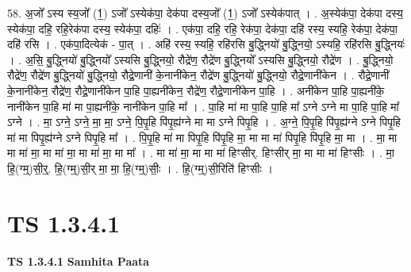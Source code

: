 \documentclass[17pt]{extarticle}
\begin{document}
58. अ॒जो᳚ ऽस्य स्य॒जो᳚ (1॒) ऽजो᳚ ऽस्येक॑पा॒ देक॑पा दस्य॒जो᳚ (1॒) ऽजो᳚ ऽस्येक॑पात् । . अ॒स्येक॑पा॒ देक॑पा दस्य॒ स्येक॑पा॒ दहि॒ रहि॒रेक॑पा दस्य॒ स्येक॑पा॒ दहिः॑ । . एक॑पा॒ दहि॒ रहि॒ रेक॑पा॒ देक॑पा॒ दहि॑ रस्य॒ स्यहि॒ रेक॑पा॒ देक॑पा॒ दहि॑ रसि । . एक॑पा॒दित्येक॑ - पा॒त् । . अहि॑ रस्य॒ स्यहि॒ रहि॑रसि बु॒द्ध्नियो॑ बु॒द्ध्नियो॒ ऽस्यहि॒ रहि॑रसि बु॒द्ध्नियः॑ । . अ॒सि॒ बु॒द्ध्नियो॑ बु॒द्ध्नियो᳚ ऽस्यसि बु॒द्ध्नियो॒ रौद्रे॑ण॒ रौद्रे॑ण बु॒द्ध्नियो᳚ ऽस्यसि बु॒द्ध्नियो॒ रौद्रे॑ण । . बु॒द्ध्नियो॒ रौद्रे॑ण॒ रौद्रे॑ण बु॒द्ध्नियो॑ बु॒द्ध्नियो॒ रौद्रे॒णानी॑ के॒नानी॑केन॒ रौद्रे॑ण बु॒द्ध्नियो॑ बु॒द्ध्नियो॒ रौद्रे॒णानी॑केन । . रौद्रे॒णानी॑ के॒नानी॑केन॒ रौद्रे॑ण॒ रौद्रे॒णानी॑केन पा॒हि पा॒ह्यनी॑केन॒ रौद्रे॑ण॒ रौद्रे॒णानी॑केन पा॒हि । . अनी॑केन पा॒हि पा॒ह्यनी॑के॒ नानी॑केन पा॒हि मा॑ मा पा॒ह्यनी॑के॒ नानी॑केन पा॒हि मा᳚ । . पा॒हि मा॑ मा पा॒हि पा॒हि मा᳚ ऽग्ने ऽग्ने मा पा॒हि पा॒हि मा᳚ ऽग्ने । . मा॒ ऽग्ने॒ ऽग्ने॒ मा॒ मा॒ ऽग्ने॒ पि॒पृ॒हि पि॑पृ॒ह्य॑ग्ने मा मा ऽग्ने पिपृ॒हि । . अ॒ग्ने॒ पि॒पृ॒हि पि॑पृ॒ह्य॑ग्ने ऽग्ने पिपृ॒हि मा॑ मा पिपृ॒ह्य॑ग्ने ऽग्ने पिपृ॒हि मा᳚ । . पि॒पृ॒हि मा॑ मा पिपृ॒हि पि॑पृ॒हि मा॒ मा मा मा॑ पिपृ॒हि पि॑पृ॒हि मा॒ मा । . मा॒ मा मा मा॑ मा॒ मा मा॑ मा॒ मा मा॑ मा॒ मा मा᳚ । . मा मा॑ मा॒ मा मा मा॑ हिꣳसीर्. हिꣳसीर् मा॒ मा मा मा॑ हिꣳसीः । . मा॒ हि॒(ग्म्॒)सी॒र्॒. हि॒(ग्म्॒)सी॒र् मा॒ मा॒ हि॒(ग्म्॒)सीः॒ । . हि॒(ग्म्॒)सी॒रिति॑ हिꣳसीः । \newline
\pagebreak
{}

\section{ TS 1.3.4.1 }

\textbf{TS 1.3.4.1 } \newline
\textbf{Samhita Paata} \newline
\end{document}
